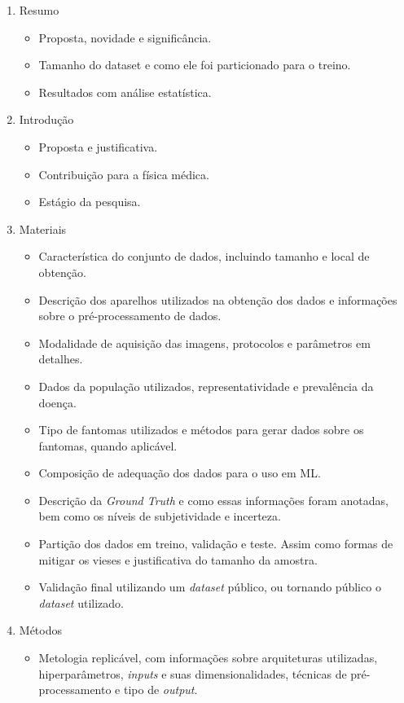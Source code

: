 \begin{enumerate}
    \item Resumo
    \begin{itemize}
        \item Proposta, novidade e significância.
        \item Tamanho do dataset e como ele foi particionado para o treino.
        \item Resultados com análise estatística.
    \end{itemize}
    \item Introdução
    \begin{itemize}
        \item Proposta e justificativa.
        \item Contribuição para a física médica.
        \item Estágio da pesquisa.
    \end{itemize}
    \item Materiais
    \begin{itemize}
        \item Característica do conjunto de dados, incluindo tamanho e local de obtenção.
        \item Descrição dos aparelhos utilizados na obtenção dos dados e informações sobre o pré-processamento de dados.
        \item Modalidade de aquisição das imagens, protocolos e parâmetros em detalhes.
        \item Dados da população utilizados, representatividade e prevalência da doença.
        \item Tipo de fantomas utilizados e métodos para gerar dados sobre os fantomas, quando aplicável.
        \item Composição de adequação dos dados para o uso em ML.
        \item Descrição da \textit{Ground Truth} e como essas informações foram anotadas, bem como os níveis de subjetividade e incerteza.
        \item Partição dos dados em treino, validação e teste. Assim como formas de mitigar os vieses e justificativa do tamanho da amostra.
        \item Validação final utilizando um \textit{dataset} público, ou tornando público o \textit{dataset} utilizado.
    \end{itemize}
    \item Métodos
    \begin{itemize}
        \item Metologia replicável, com informações sobre arquiteturas utilizadas, hiperparâmetros, \textit{inputs} e suas dimensionalidades, técnicas de pré-processamento e tipo de \textit{output}.

\end{itemize}
\end{enumerate}

